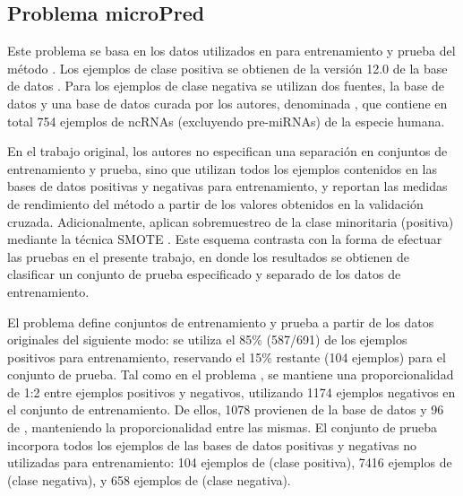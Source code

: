 \subsection{Problema microPred}
Este problema se basa en los datos utilizados en \cite{batuwita} para
entrenamiento y prueba del método .  Los ejemplos de
clase positiva se obtienen de la versión 12.0 de la base de datos
. Para los ejemplos de clase negativa se utilizan dos fuentes,
la base de datos  y una base de datos curada por los
autores, denominada , que contiene en total 754
ejemplos de ncRNAs (excluyendo pre-miRNAs) de la especie humana.

En el trabajo original, los autores no especifican una separación
en conjuntos de entrenamiento y prueba, sino que utilizan todos los
ejemplos contenidos en las bases de datos positivas y negativas para
entrenamiento, y reportan las medidas de rendimiento del método
a partir de los valores obtenidos en la validación cruzada.
Adicionalmente, aplican sobremuestreo de la clase minoritaria (positiva)
mediante la técnica SMOTE \cite{smote}.
Este esquema contrasta con la forma de efectuar las pruebas en el
presente trabajo, en donde los resultados se obtienen de clasificar un
conjunto de prueba especificado y separado de los datos de entrenamiento.

El problema \micropred{} define conjuntos de entrenamiento y prueba
a partir de los datos originales del siguiente modo:
se utiliza el 85\% (587/691) de los ejemplos
positivos para entrenamiento, reservando el 15\% restante (104
ejemplos) para el conjunto de prueba.
Tal como en el problema , se mantiene una proporcionalidad
de 1:2 entre ejemplos positivos y negativos, utilizando 1174 ejemplos
negativos en el conjunto de entrenamiento. De ellos, 1078 provienen de
la base de datos  y 96 de , manteniendo la
proporcionalidad entre las mismas.
El conjunto de prueba incorpora todos los ejemplos
de las bases de datos positivas y negativas no utilizadas
para entrenamiento: 104 ejemplos de
 (clase positiva), 7416 ejemplos de  (clase
negativa), y 658 ejemplos de  (clase negativa).